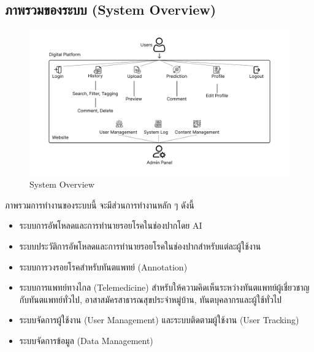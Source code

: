 \subsection{ภาพรวมของระบบ (System Overview)}
\begin{figure}[h]
    \begin{center}
        \includegraphics[width=1\textwidth]{img/Overview System Design.png}
    \end{center}
    \caption[Poem]{System Overview}
    \label{fig:walrus}
\end{figure}

ภาพรวมการทำงานของระบบนี้ จะมีส่วนการทำงานหลัก ๆ ดังนี้
\begin{itemize}
    \item ระบบการอัพโหลดและการทำนายรอยโรคในช่องปากโดย AI
    \item ระบบประวัติการอัพโหลดและการทำนายรอยโรคในช่องปากสำหรับแต่ละผู้ใช้งาน
    \item ระบบการวงรอยโรคสำหรับทันตแพทย์ (Annotation)
    \item ระบบการแพทย์ทางไกล (Telemedicine) สำหรับให้ความคิดเห็นระหว่างทันตแพทย์ผู้เชี่ยวชาญกับทันตแพทย์ทั่วไป, อาสาสมัครสาธารณสุขประจำหมู่บ้าน, ทันตบุคลากรและผู้ใช้ทั่วไป
    \item ระบบจัดการผู้ใช้งาน (User Management) และระบบติดตามผู้ใช้งาน (User Tracking)
    \item ระบบจัดการข้อมูล (Data Management)
\end{itemize}

